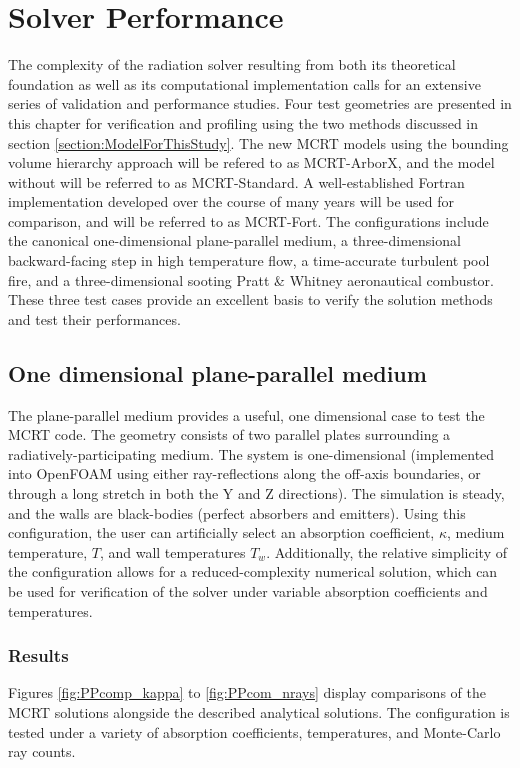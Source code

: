 \addchapheadtotoc
\chapter{Solver Performance}\label{chapter:Example}
The complexity of the radiation solver resulting from both its theoretical foundation as well as its computational implementation calls for an extensive series of validation and performance studies.
Four test geometries are presented in this chapter for verification and profiling using the two methods discussed in section \ref{section:ModelForThisStudy}. The new MCRT models using the bounding volume hierarchy approach will be refered to as MCRT-ArborX, and the model without will be referred to as MCRT-Standard. 
A well-established Fortran implementation developed over the course of many years will be used for comparison, and will be referred to as MCRT-Fort.
The configurations include the canonical one-dimensional plane-parallel medium, a three-dimensional backward-facing step in high temperature flow, a time-accurate turbulent pool fire, and a three-dimensional sooting Pratt \& Whitney aeronautical combustor. 
These three test cases provide an excellent basis to verify the solution methods and test their performances. 



\section{One dimensional plane-parallel medium}
The plane-parallel medium provides a useful, one dimensional case to test the MCRT code. The geometry consists of two parallel plates surrounding a radiatively-participating medium. 
The system is one-dimensional (implemented into OpenFOAM using either ray-reflections along the off-axis boundaries, or through a long stretch in both the Y and Z directions). The simulation is steady, and the walls are black-bodies (perfect absorbers and emitters).
Using this configuration, the user can artificially select an absorption coefficient, $\kappa{}$, medium temperature, $T$, and wall temperatures $T_w$.
Additionally, the relative simplicity of the configuration allows for a reduced-complexity numerical solution, which can be used for verification of the solver under variable absorption coefficients and temperatures.

\subsection{Results}
Figures \ref{fig:PPcomp_kappa} to \ref{fig:PPcom_nrays} display comparisons of the MCRT solutions alongside the described analytical solutions. The configuration is tested under a variety of absorption coefficients, temperatures, and Monte-Carlo ray counts.

